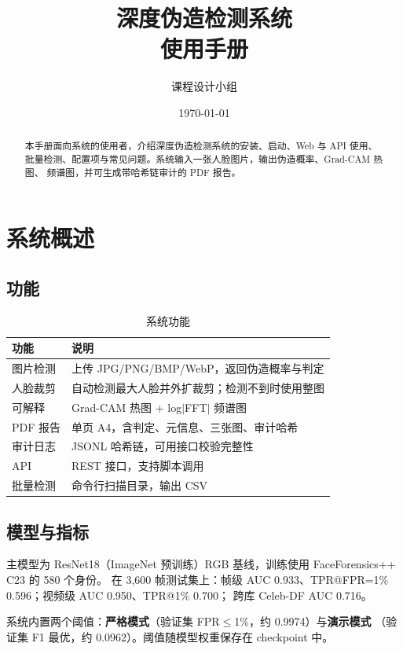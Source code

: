 \documentclass[12pt,a4paper]{article}
\title{\textbf{深度伪造检测系统\\使用手册}}
\author{课程设计小组}
\date{\today}
\begin{document}
\maketitle

\begin{abstract}
\noindent
本手册面向系统的使用者，介绍深度伪造检测系统的安装、启动、Web 与 API 使用、
批量检测、配置项与常见问题。系统输入一张人脸图片，输出伪造概率、Grad-CAM 热图、
频谱图，并可生成带哈希链审计的 PDF 报告。
\end{abstract}

\tableofcontents
\newpage

\section{系统概述}

\subsection{功能}

\begin{table}[H]
\centering
\caption{系统功能}
\small
\begin{tabular}{p{4.2cm}p{10cm}}
\toprule
功能 & 说明 \\
\midrule
图片检测 & 上传 JPG/PNG/BMP/WebP，返回伪造概率与判定 \\
人脸裁剪 & 自动检测最大人脸并外扩裁剪；检测不到时使用整图 \\
可解释 & Grad-CAM 热图 + log$|$FFT$|$ 频谱图 \\
PDF 报告 & 单页 A4，含判定、元信息、三张图、审计哈希 \\
审计日志 & JSONL 哈希链，可用接口校验完整性 \\
API & REST 接口，支持脚本调用 \\
批量检测 & 命令行扫描目录，输出 CSV \\
\bottomrule
\end{tabular}
\end{table}

\subsection{模型与指标}

主模型为 ResNet18（ImageNet 预训练）RGB 基线，训练使用 FaceForensics++ C23 的 580 个身份。
在 3,600 帧测试集上：帧级 AUC 0.933、TPR@FPR=1\% 0.596；视频级 AUC 0.950、TPR@1\% 0.700；
跨库 Celeb-DF AUC 0.716。

系统内置两个阈值：\textbf{严格模式}（验证集 FPR$\le$1\%，约 0.9974）与\textbf{演示模式}
（验证集 F1 最优，约 0.0962）。阈值随模型权重保存在 checkpoint 中。
\end{document}

